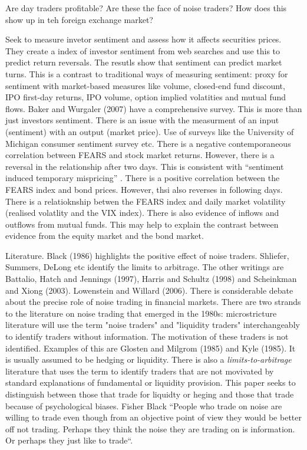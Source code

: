 \documentclass[12pt, a4paper, oneside]{article} %
\begin{document}
Are day traders profitable? Are these the face of noise traders?  How does this show up in teh foreign exchange market? 


\citet{da2010sum} Seek to measure invetor sentiment and assess how it affects securities prices. They create a index of investor sentiment from web searches and use this to predict return reversals.  The resutls show that sentiment can predict market turns. This is a contrast to traditional ways of measuring sentiment:  proxy for sentiment with market-based measures like volume, closed-end fund discount, IPO first-day returns, IPO volume, option implied volatities and mutual fund flows. Baker and Wurgaler (2007) have a comprehensive survey. This is more than just investors sentiment. There is an issue with the measurment of an input (sentiment) with an output (market price). Use of surveys like the University of Michigan consumer sentiment survey etc.  There is a negative contemporaneous correlation between FEARS and stock market returns. However, there is a reversal in the relationship after two days.  This is consistent with ``sentiment induced temporary mispricing'' \citet[p. 4]{da2010sum}.  There is a positive correlation between the FEARS index and bond prices.  However, thsi also reverses in following days. There is a relatioknship betwen the FEARS index and daily market volatility (realised volatlity and the VIX index). There is also evidence of inflows and outflows from mutual funds.  This may help to explain the contrast between evidence from the equity market and the bond market.  


Literature.  Black (1986) highlights the positive effect of noise traders. Shliefer, Summers, DeLong etc identify the limits to arbitrage. The other writings are Battalio, Hatch and Jennings (1997), Harris and Schultz (1998) and Scheinkman and Xiong (2003).  Lowenstein and Willard (2006).  There is considerable debate about the precise role of noise trading in financial markets. There are two strands to the literature on noise trading that emerged in the 1980s:  microstricture literature will use the term "noise traders" and "liquidity traders" interchangeably to identify traders without information.  The motivation of these traders is not identified. Examples of this are Glosten and Milgrom (1985) and Kyle (1985). It is usually assumed to be hedging or liquidity. There is also a \emph{limits-to-arbitrage} literature that uses the term to identify traders that are not movivated by standard explanations of fundamental or liquidity provision. This paper seeks to distinguish between those that trade for liquidty or heging and those that trade because of psychological biases. Fisher Black ``People who trade on noise are willing to trade even though from an objective point of view they would be better off not trading. Perhaps they think the noise they are trading on is information. Or perhaps they just like to trade``.  
\end{document}
